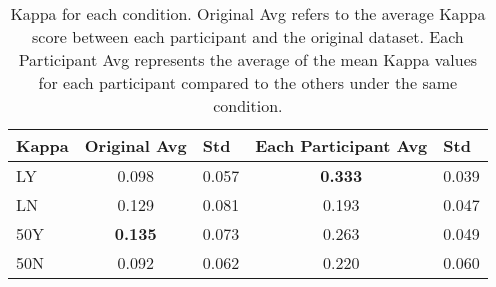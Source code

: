 \begin{table}[h]
\begin{tabular}{l|cccc}
Kappa & \multicolumn{1}{l}{Original Avg} & \multicolumn{1}{l}{Std} & \multicolumn{1}{l}{Each Participant Avg} & \multicolumn{1}{l}{Std} \\
\hline
\multicolumn{1}{l|}{LY}    & 0.098 & 0.057    & \textbf{0.333}& 0.039    \\
\multicolumn{1}{l|}{LN}   & 0.129             & 0.081    & 0.193&0.047    \\
\multicolumn{1}{l|}{50Y}   & \textbf{0.135}             & 0.073    & 0.263&	0.049    \\
\multicolumn{1}{l|}{50N}  & 0.092             & 0.062    & 0.220& 0.060             \\
\bottomrule
\end{tabular}
\caption{Kappa for each condition. Original Avg refers to the average Kappa score between each participant and the original dataset. Each Participant Avg represents the average of the mean Kappa values for each participant compared to the others under the same condition.}
    \label{tab:kappa-detail}
\end{table}